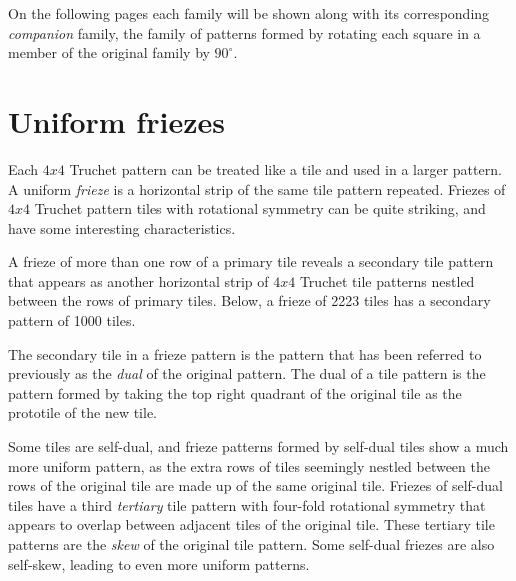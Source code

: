 \documentclass{tufte-book}
\begin{document}
\vspace{0.5cm}

\noindent
On the following pages each family will be shown along with its corresponding \textit{companion} family, the family of patterns formed by rotating each square in a member of the original family by $90^{\circ}$. 

\newpage


% 
% 
\chapter{Uniform friezes}

\noindent
Each $4x4$ Truchet pattern can be treated like a tile and used in a larger pattern. A uniform \textit{frieze} is a horizontal strip of the same tile pattern repeated. Friezes of $4x4$ Truchet pattern tiles with rotational symmetry can be quite striking, and have some interesting characteristics. 

\vspace{0.5cm}
\noindent
A frieze of more than one row of a primary tile reveals a secondary tile pattern that appears as another horizontal strip of $4x4$ Truchet tile patterns nestled between the rows of primary tiles. Below, a frieze of 2223 tiles has a secondary pattern of 1000 tiles.
\,

\vspace{0.5cm}


\vspace{0.5cm}
\noindent
The secondary tile in a frieze pattern is the pattern that has been referred to previously as the \textit{dual} of the original pattern. The dual of a tile pattern is the pattern formed by taking the top right quadrant of the original tile as the prototile of the new tile.

\vspace{0.5cm}
\noindent
Some tiles are self-dual, and frieze patterns formed by self-dual tiles show a much more uniform pattern, as the extra rows of tiles seemingly nestled between the rows of the original tile are made up of the same original tile. Friezes of self-dual tiles have a third \textit{tertiary} tile pattern with four-fold rotational symmetry that appears to overlap between adjacent tiles of the original tile. These tertiary tile patterns are the \textit{skew} of the original tile pattern. Some self-dual friezes are also self-skew, leading to even more uniform patterns.
\end{document}
